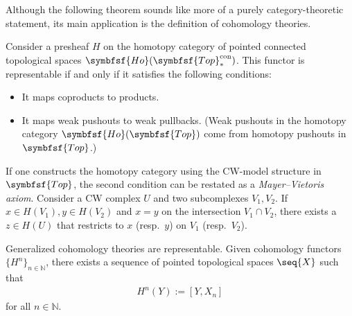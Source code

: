     Although the following theorem sounds like more of a purely category-theoretic statement, its main application is the definition of cohomology theories.
    \begin{theorem}\label{topology:brown}
        Consider a presheaf $H$ on the homotopy category of pointed connected topological spaces $\symbfsf{Ho}(\symbfsf{Top}^{\text{con}}_*)$. This functor is representable if and only if it satisfies the following conditions:
        \begin{itemize}
            \item It maps coproducts to products.
            \item It maps weak pushouts to weak pullbacks. (Weak pushouts in the homotopy category $\symbfsf{Ho}(\symbfsf{Top})$ come from homotopy pushouts in $\symbfsf{Top}$.)
        \end{itemize}
    \end{theorem}
    \begin{remark}
        If one constructs the homotopy category using the CW-model structure in $\symbfsf{Top}$, the second condition can be restated as a \textit{Mayer--Vietoris axiom}. Consider a CW complex $U$ and two subcomplexes $V_1,V_2$. If $x\in H(V_1),y\in H(V_2)$ and $x=y$ on the intersection $V_1\cap V_2$, there exists a $z\in H(U)$ that restricts to $x$ (resp.~$y$) on $V_1$ (resp.~$V_2$).
    \end{remark}
    \begin{result}[Cohomology]
        Generalized cohomology theories are representable. Given cohomology functors $\{H^n\}_{n\in\mathbb{N}}$, there exists a sequence of pointed topological spaces $\seq{X}$ such that
        \begin{gather}
            H^n(Y) := [Y,X_n]
        \end{gather}
        for all $n\in\mathbb{N}$.
    \end{result}

